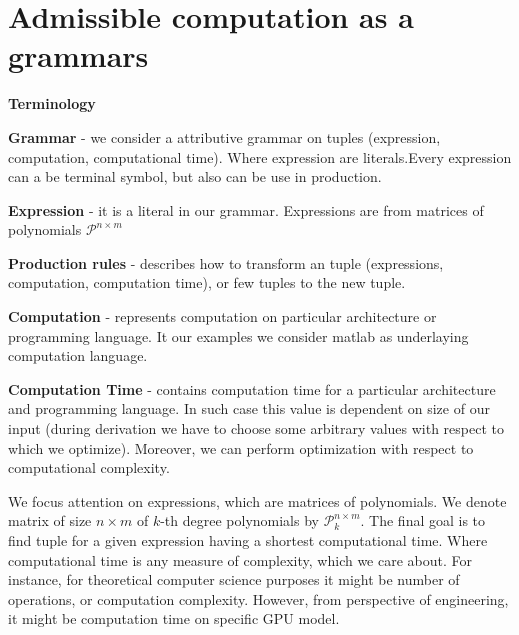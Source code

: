 \documentclass{article}
\begin{document}


\section{Admissible computation as a grammars}\label{sec:grammars}

{\bf Terminology}


{\bf Grammar} - we consider a attributive grammar on tuples (expression, computation, computational time). Where expression are literals.Every expression can a be terminal symbol, but also can be use in production.


{\bf Expression} - it is a literal in our grammar. Expressions are from matrices of polynomials $\mathcal{P}^{n \times m}$


{\bf Production rules} - describes how to transform an tuple (expressions, computation, computation time), or few tuples to the new tuple.


{\bf Computation} - represents computation on particular architecture or programming language. It our examples we consider matlab as underlaying computation language.


{\bf Computation Time} - contains computation time for a particular architecture and programming language. In such case this value is dependent on size of our input (during derivation we have to choose some arbitrary values with respect to which we optimize). Moreover, we can perform optimization with respect to computational complexity.


We focus attention on expressions, which are matrices of polynomials. We denote
matrix of size $n \times m$ of $k$-th degree polynomials by $\mathcal{P}^{n
\times m}_k$.  The final goal is to find tuple for a given expression having
a shortest computational time. Where computational time is any measure of
complexity, which we care about. For instance, for theoretical computer science
purposes it might be number of operations, or computation complexity. However,
from perspective of engineering, it might be computation time on specific GPU
model. 
\end{document}
